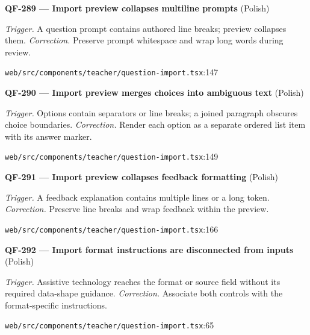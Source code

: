 \begin{minipage}{\linewidth}
\textbf{QF-289 --- Import preview collapses multiline prompts} {\scriptsize\color{accent}(Polish)}\par
\textit{Trigger.} A question prompt contains authored line breaks; preview collapses them. \textit{Correction.} Preserve prompt whitespace and wrap long words during review.\par
{\scriptsize\color{muted}\nolinkurl{web/src/components/teacher/question-import.tsx}:147}\par
\end{minipage}\par\vspace{7pt}
\begin{minipage}{\linewidth}
\textbf{QF-290 --- Import preview merges choices into ambiguous text} {\scriptsize\color{accent}(Polish)}\par
\textit{Trigger.} Options contain separators or line breaks; a joined paragraph obscures choice boundaries. \textit{Correction.} Render each option as a separate ordered list item with its answer marker.\par
{\scriptsize\color{muted}\nolinkurl{web/src/components/teacher/question-import.tsx}:149}\par
\end{minipage}\par\vspace{7pt}
\begin{minipage}{\linewidth}
\textbf{QF-291 --- Import preview collapses feedback formatting} {\scriptsize\color{accent}(Polish)}\par
\textit{Trigger.} A feedback explanation contains multiple lines or a long token. \textit{Correction.} Preserve line breaks and wrap feedback within the preview.\par
{\scriptsize\color{muted}\nolinkurl{web/src/components/teacher/question-import.tsx}:166}\par
\end{minipage}\par\vspace{7pt}
\begin{minipage}{\linewidth}
\textbf{QF-292 --- Import format instructions are disconnected from inputs} {\scriptsize\color{accent}(Polish)}\par
\textit{Trigger.} Assistive technology reaches the format or source field without its required data-shape guidance. \textit{Correction.} Associate both controls with the format-specific instructions.\par
{\scriptsize\color{muted}\nolinkurl{web/src/components/teacher/question-import.tsx}:65}\par
\end{minipage}\par\vspace{7pt}
